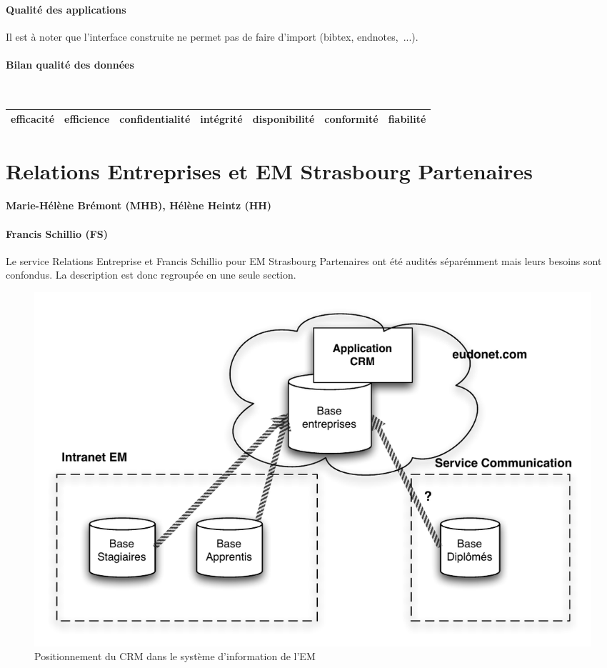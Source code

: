 \documentclass{book}
\begin{document}
\paragraph{Qualité des applications}
Il est à noter que l'interface construite ne permet pas de faire d'import (bibtex, 
endnotes,~...). 

\paragraph{Bilan qualité des données}
~\\


	\begin{tabular}{|l|l|l|l|l|l|l|}
	\hline
	efficacité	& efficience &	confidentialité	& intégrité & disponibilité & conformité & fiabilité \\
	\hline
	
	\hline
	\end{tabular}
	



\section{Relations Entreprises et EM Strasbourg Partenaires}
\paragraph{Marie-Hélène Brémont (MHB), Hélène Heintz (HH)}
\paragraph{Francis Schillio (FS)}

Le service Relations Entreprise et Francis Schillio pour EM Strasbourg 
Partenaires ont été audités séparémment mais leurs besoins sont confondus.
La description est donc regroupée en une seule section.\\



\begin{figure}[hbt]
\begin{center}
\includegraphics[width=.9\linewidth]{figs/crm_overview.pdf}
\end{center}
\caption{Positionnement du CRM dans le système d'information de l'EM}
\label{fg:crm_overview}
\end{figure}
\end{document}
